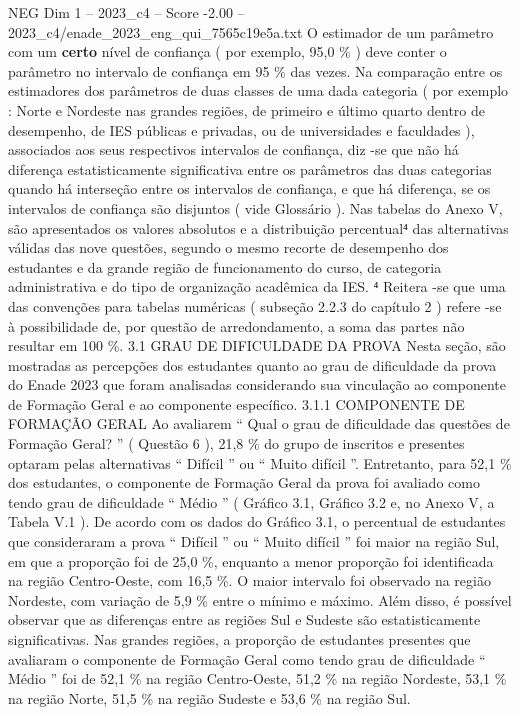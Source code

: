 \begin{textsample}{NEG Dim 1 – 2023\_c4 – Score -2.00 – 2023\_c4/enade\_2023\_eng\_qui\_7565c19e5a.txt}
O estimador de um parâmetro com um \textbf{certo} nível de confiança ( por exemplo, 95,0 \% ) deve conter o parâmetro no intervalo de confiança em 95 \% das vezes.
Na comparação entre os estimadores dos parâmetros de duas classes de uma dada categoria ( por exemplo : Norte e Nordeste nas grandes regiões, de primeiro e último quarto dentro de desempenho, de IES públicas e privadas, ou de universidades e faculdades ), associados aos seus respectivos intervalos de confiança, diz -se que não há diferença estatisticamente significativa entre os parâmetros das duas categorias quando há interseção entre os intervalos de confiança, e que há diferença, se os intervalos de confiança são disjuntos ( vide Glossário ).
Nas tabelas do Anexo V, são apresentados os valores absolutos e a distribuição percentual⁴ das alternativas válidas das nove questões, segundo o mesmo recorte de desempenho dos estudantes e da grande região de funcionamento do curso, de categoria administrativa e do tipo de organização acadêmica da IES. ⁴ Reitera -se que uma das convenções para tabelas numéricas ( subseção 2.2.3 do capítulo 2 ) refere -se à possibilidade de, por questão de arredondamento, a soma das partes não resultar em 100 \%. 3.1 GRAU DE DIFICULDADE DA PROVA Nesta seção, são mostradas as percepções dos estudantes quanto ao grau de dificuldade da prova do Enade 2023 que foram analisadas considerando sua vinculação ao componente de Formação Geral e ao componente específico. 3.1.1 COMPONENTE DE FORMAÇÃO GERAL Ao avaliarem “ Qual o grau de dificuldade das questões de Formação Geral? ” ( Questão 6 ), 21,8 \% do grupo de inscritos e presentes optaram pelas alternativas “ Difícil ” ou “ Muito difícil ”.
Entretanto, para 52,1 \% dos estudantes, o componente de Formação Geral da prova foi avaliado como tendo grau de dificuldade “ Médio ” ( Gráfico 3.1, Gráfico 3.2 e, no Anexo V, a Tabela V.1 ).
De acordo com os dados do Gráfico 3.1, o percentual de estudantes que consideraram a prova “ Difícil ” ou “ Muito difícil ” foi maior na região Sul, em que a proporção foi de 25,0 \%, enquanto a menor proporção foi identificada na região Centro-Oeste, com 16,5 \%.
O maior intervalo foi observado na região Nordeste, com variação de 5,9 \% entre o mínimo e máximo.
Além disso, é possível observar que as diferenças entre as regiões Sul e Sudeste são estatisticamente significativas.
Nas grandes regiões, a proporção de estudantes presentes que avaliaram o componente de Formação Geral como tendo grau de dificuldade “ Médio ” foi de 52,1 \% na região Centro-Oeste, 51,2 \% na região Nordeste, 53,1 \% na região Norte, 51,5 \% na região Sudeste e 53,6 \% na região Sul.

\end{textsample}
